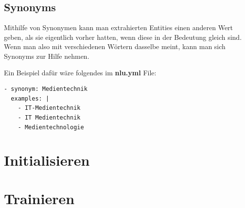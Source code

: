 \subsection{Synonyms}

Mithilfe von Synonymen kann man extrahierten Entities einen anderen Wert geben, als sie eigentlich vorher hatten, wenn diese in der Bedeutung gleich sind.
Wenn man also mit verschiedenen Wörtern dasselbe meint, kann man sich Synonyms zur Hilfe nehmen.\cite{synonyms}

Ein Beispiel dafür wäre folgendes im \textbf{nlu.yml} File:

\begin{lstlisting}[label={lst: Synonym Example}]
- synonym: Medientechnik
  examples: |
    - IT-Medientechnik
    - IT Medientechnik
    - Medientechnologie
\end{lstlisting}

\section{Initialisieren}


\section{Trainieren}
